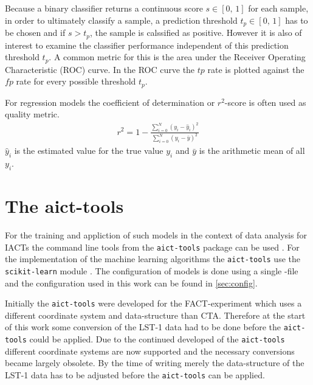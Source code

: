 Because a binary classifier returns a continuous score $s \in [0,\, 1]$ for each sample, in order to ultimately classify a sample,
a prediction threshold $t_p \in [0,\, 1]$ has to be chosen and if $s > t_p$, the sample is calssified as positive. 
However it is also of interest to examine the classifier performance independent of this prediction threshold $t_p$.
A common metric for this is the area under the Receiver Operating Characteristic (ROC) curve.
In the ROC curve the $tp$ rate is plotted against the $fp$ rate for every possible threshold $t_p$.

For regression models the coefficient of determination or $r^2$-score is often used as quality metric.
\begin{align}
    r^2 = 1 - \frac{\sum_{i = 0}^N (y_i - \hat{y}_i)^2}{\sum_{i = 0}^N (y_i - \bar{y})^2}
\end{align}
$\hat{y}_i$ is the estimated value for the true value $y_i$ and $\bar{y}$ is the arithmetic mean of all $y_i$.


\section{The aict-tools}
For the training and appliction of such models in the context of data analysis for IACTs the command line tools from the \texttt{aict-tools} package can be used \cite{aict-tools}. 
For the implementation of the machine learning algorithms the \texttt{aict-tools} use the \texttt{scikit-learn} module \cite{scikit-learn}.
The configuration of models is done using a single -file and the configuration used in this work can be found in \autoref{sec:config}.

Initially the \texttt{aict-tools} were developed for the FACT-experiment which uses a different coordinate system and data-structure than CTA.
Therefore at the start of this work some conversion of the LST-1 data had to be done before the \texttt{aict-tools} could be applied.
Due to the continued developed of the \texttt{aict-tools} different coordinate systems are now supported and the necessary conversions became largely obsolete.
By the time of writing merely the data-structure of the LST-1 data has to be adjusted before the \texttt{aict-tools} can be applied.

